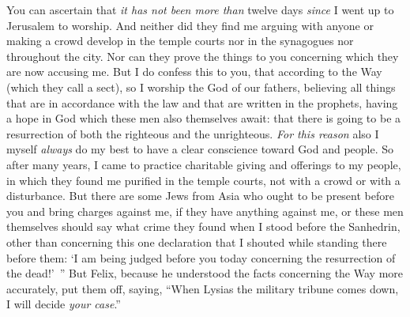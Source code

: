 \begin{biblechapter}
\verse You can ascertain that \textit{it has not been more than} twelve days \textit{since} I went up to Jerusalem to worship.
\verse And neither did they find me arguing with anyone or making a crowd develop in the temple courts nor in the synagogues nor throughout the city.
\verse Nor can they prove the things to you concerning which they are now accusing me.
\verse But I do confess this to you, that according to the Way (which they call a sect), so I worship the God of our fathers, believing all things that are in accordance with the law and that are written in the prophets,
\verse having a hope in God which these men also themselves await: that there is going to be a resurrection of both the righteous and the unrighteous.
\verse \textit{For this reason} also I myself \textit{always} do my best to have a clear conscience toward God and people.
\verse So after many years, I came to practice charitable giving and offerings to my people,
\verse in which they found me purified in the temple courts, not with a crowd or with a disturbance.
\verse But there are some Jews from Asia who ought to be present before you and bring charges against me, if they have anything against me,
\verse or these men themselves should say what crime they found when I stood before the Sanhedrin,
\verse other than concerning this one declaration that I shouted while standing there before them: ‘I am being judged before you today concerning the resurrection of the dead!’ ”
 But Felix, because he understood the facts concerning the Way more accurately, put them off, saying, “When Lysias the military tribune comes down, I will decide \textit{your case}.”

\end{biblechapter}
